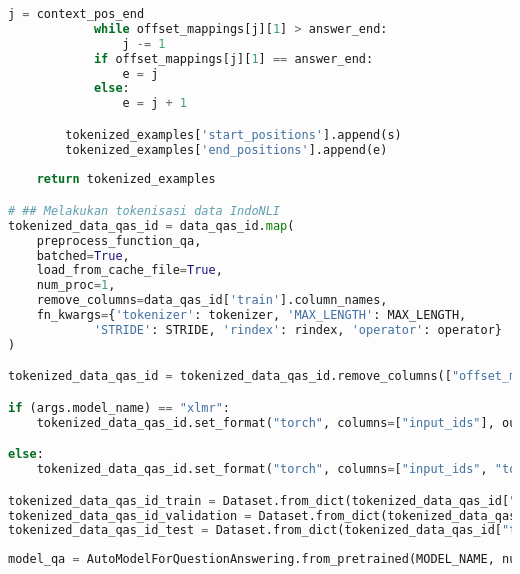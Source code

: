 \begin{lstlisting}[language=Python, caption=Proses \emph{preprocess} dan tokenisasi \emph{dataset} sistem tanya jawab]
            j = context_pos_end
            while offset_mappings[j][1] > answer_end:
                j -= 1      
            if offset_mappings[j][1] == answer_end:
                e = j
            else:
                e = j + 1

        tokenized_examples['start_positions'].append(s)
        tokenized_examples['end_positions'].append(e)
    
    return tokenized_examples

# ## Melakukan tokenisasi data IndoNLI
tokenized_data_qas_id = data_qas_id.map(
    preprocess_function_qa,
    batched=True,
    load_from_cache_file=True,
    num_proc=1,
    remove_columns=data_qas_id['train'].column_names,
    fn_kwargs={'tokenizer': tokenizer, 'MAX_LENGTH': MAX_LENGTH, 
            'STRIDE': STRIDE, 'rindex': rindex, 'operator': operator}
)

tokenized_data_qas_id = tokenized_data_qas_id.remove_columns(["offset_mapping", "overflow_to_sample_mapping"])

if (args.model_name) == "xlmr":
    tokenized_data_qas_id.set_format("torch", columns=["input_ids"], output_all_columns=True, device=device)

else:
    tokenized_data_qas_id.set_format("torch", columns=["input_ids", "token_type_ids"], output_all_columns=True, device=device)

tokenized_data_qas_id_train = Dataset.from_dict(tokenized_data_qas_id["train"][:SAMPLE])
tokenized_data_qas_id_validation = Dataset.from_dict(tokenized_data_qas_id["validation"][:SAMPLE])
tokenized_data_qas_id_test = Dataset.from_dict(tokenized_data_qas_id["test"][:SAMPLE])
\end{lstlisting}

\begin{lstlisting}[language=Python, caption=Mengimpor model \emph{question answering}]
model_qa = AutoModelForQuestionAnswering.from_pretrained(MODEL_NAME, num_labels=2)
\end{lstlisting}

